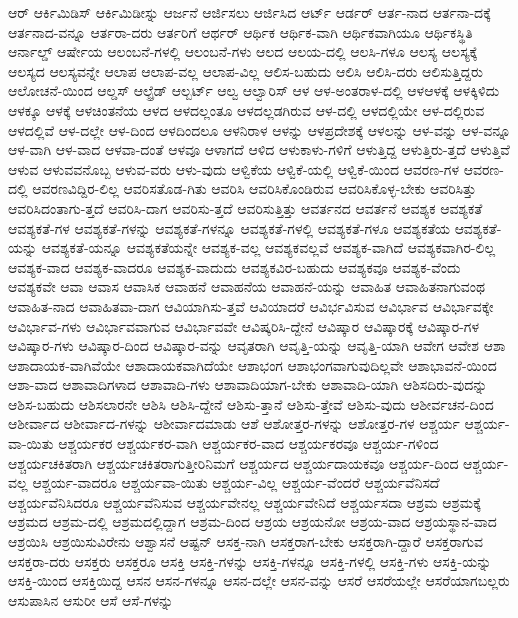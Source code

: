 {ಆರ್
ಆರ್ಕಿಮಿಡಿಸ್
ಆರ್ಕಿಮಿಡೀಸ್ನು
ಆರ್ಜನೆ
ಆರ್ಜಿಸಲು
ಆರ್ಜಿಸಿದ
ಆರ್ಟ್
ಆರ್ಡರ್
ಆರ್ತ-ನಾದ
ಆರ್ತನಾ-ದಕ್ಕೆ
ಆರ್ತನಾದ-ವನ್ನೂ
ಆರ್ತರಾ-ದರು
ಆರ್ತರಿಗೆ
ಆರ್ಥರ್
ಆರ್ಥಿಕ
ಆರ್ಥಿಕ-ವಾಗಿ
ಆರ್ಥಿಕವಾಗಿಯೂ
ಆರ್ಥಿಕಸ್ಥಿತಿ
ಆರ್ನಾಲ್ಡ್
ಆರ್ಷೇಯ
ಆಲಂಬನೆ-ಗಳಲ್ಲಿ
ಆಲಂಬನೆ-ಗಳು
ಆಲದ
ಆಲಯ-ದಲ್ಲಿ
ಆಲಸಿ-ಗಳೂ
ಆಲಸ್ಯ
ಆಲಸ್ಯಕ್ಕೆ
ಆಲಸ್ಯದ
ಆಲಸ್ಯವನ್ನೇ
ಆಲಾಪ
ಆಲಾಪ-ವಲ್ಲ
ಆಲಾಪ-ವಿಲ್ಲ
ಆಲಿಸ-ಬಹುದು
ಆಲಿಸಿ
ಆಲಿಸಿ-ದರು
ಆಲಿಸುತ್ತಿದ್ದರು
ಆಲೋಚನೆ-ಯಿಂದ
ಆಲ್ಡಸ್
ಆಲ್ಫ್ರೆಡ್
ಆಲ್ಬರ್ಟ್
ಆಲ್ವ
ಆಲ್ವಾರಿಸ್
ಆಳ
ಆಳ-ಅಂತರಾಳ-ದಲ್ಲಿ
ಆಳಆಳಕ್ಕೆ
ಆಳಕ್ಕಿಳಿದು
ಆಳಕ್ಕೂ
ಆಳಕ್ಕೆ
ಆಳಚಿಂತನೆಯ
ಆಳದ
ಆಳದಲ್ಲಂತೂ
ಆಳದಲ್ಲಡಗಿರುವ
ಆಳ-ದಲ್ಲಿ
ಆಳದಲ್ಲಿಯೇ
ಆಳ-ದಲ್ಲಿರುವ
ಆಳದಲ್ಲಿವೆ
ಆಳ-ದಲ್ಲೇ
ಆಳ-ದಿಂದ
ಆಳದಿಂದಲೂ
ಆಳನಿರಾಳ
ಆಳನ್ನು
ಆಳಪ್ರದೇಶಕ್ಕೆ
ಆಳಲನ್ನು
ಆಳ-ವನ್ನು
ಆಳ-ವನ್ನೂ
ಆಳ-ವಾಗಿ
ಆಳ-ವಾದ
ಆಳವಾ-ದಂತೆ
ಆಳವೂ
ಆಳಾಗದೆ
ಆಳಿದ
ಆಳುಕಾಳು-ಗಳಿಗೆ
ಆಳುತ್ತಿದ್ದ
ಆಳುತ್ತಿರು-ತ್ತದೆ
ಆಳುತ್ತಿವೆ
ಆಳುವ
ಆಳುವವನೊಬ್ಬ
ಆಳುವ-ವರು
ಆಳು-ವುದು
ಆಳ್ವಿಕೆಯ
ಆಳ್ವಿಕೆ-ಯಲ್ಲಿ
ಆಳ್ವಿಕೆ-ಯಿಂದ
ಆವರಣ-ಗಳ
ಆವರಣ-ದಲ್ಲಿ
ಆವರಣವಿದ್ದಿರ-ಲಿಲ್ಲ
ಆವರಿಸತೊಡ-ಗಿತು
ಆವರಿಸಿ
ಆವರಿಸಿಕೊಂಡಿರುವ
ಆವರಿಸಿಕೊಳ್ಳ-ಬೇಕು
ಆವರಿಸಿತ್ತು
ಆವರಿಸಿದಂತಾಗು-ತ್ತದೆ
ಆವರಿಸಿ-ದಾಗ
ಆವರಿಸು-ತ್ತದೆ
ಆವರಿಸುತ್ತಿತ್ತು
ಆವರ್ತನದ
ಆವರ್ತನೆ
ಆವಶ್ಯಕ
ಆವಶ್ಯಕತೆ
ಆವಶ್ಯಕತೆ-ಗಳ
ಆವಶ್ಯಕತೆ-ಗಳನ್ನು
ಆವಶ್ಯಕತೆ-ಗಳನ್ನೂ
ಆವಶ್ಯಕತೆ-ಗಳಲ್ಲಿ
ಆವಶ್ಯಕತೆ-ಗಳೂ
ಆವಶ್ಯಕತೆಯ
ಆವಶ್ಯಕತೆ-ಯನ್ನು
ಆವಶ್ಯಕತೆ-ಯನ್ನೂ
ಆವಶ್ಯಕತೆಯನ್ನೇ
ಆವಶ್ಯಕ-ವಲ್ಲ
ಆವಶ್ಯಕವಲ್ಲವೆ
ಆವಶ್ಯಕ-ವಾಗಿದೆ
ಆವಶ್ಯಕವಾಗಿರ-ಲಿಲ್ಲ
ಆವಶ್ಯಕ-ವಾದ
ಆವಶ್ಯಕ-ವಾದರೂ
ಆವಶ್ಯಕ-ವಾದುದು
ಆವಶ್ಯಕವಿರ-ಬಹುದು
ಆವಶ್ಯಕವೂ
ಆವಶ್ಯಕ-ವೆಂದು
ಆವಶ್ಯಕವೇ
ಆವಾ
ಆವಾಸ
ಆವಾಸಿಕ
ಆವಾಹನೆ
ಆವಾಹನೆಯ
ಆವಾಹನೆ-ಯನ್ನು
ಆವಾಹಿತ
ಆವಾಹಿತನಾಗುವಂಥ
ಆವಾಹಿತ-ನಾದ
ಆವಾಹಿತವಾ-ದಾಗ
ಆವಿಯಾಗಿಸು-ತ್ತವೆ
ಆವಿಯಾದರೆ
ಆವಿರ್ಭವಿಸುವ
ಆವಿರ್ಭಾವ
ಆವಿರ್ಭಾವಕ್ಕೇ
ಆವಿರ್ಭಾವ-ಗಳು
ಆವಿರ್ಭಾವವಾಗುವ
ಆವಿರ್ಭಾವವೇ
ಆವಿಷ್ಕರಿಸಿ-ದ್ದೇನೆ
ಆವಿಷ್ಕಾರ
ಆವಿಷ್ಕಾರಕ್ಕೆ
ಆವಿಷ್ಕಾರ-ಗಳ
ಆವಿಷ್ಕಾರ-ಗಳು
ಆವಿಷ್ಕಾರ-ದಿಂದ
ಆವಿಷ್ಕಾರ-ವನ್ನು
ಆವೃತರಾಗಿ
ಆವೃತ್ತಿ-ಯನ್ನು
ಆವೃತ್ತಿ-ಯಾಗಿ
ಆವೇಗ
ಆವೇಶ
ಆಶಾ
ಆಶಾದಾಯಕ-ವಾಗಿವೆಯೇ
ಆಶಾದಾಯಕವಾಗಿದೆಯೇ
ಆಶಾಭಂಗ
ಆಶಾಭಂಗವಾಗುವುದಿಲ್ಲವೇ
ಆಶಾಭಾವನೆ-ಯಿಂದ
ಆಶಾ-ವಾದ
ಆಶಾವಾದಿಗಳಾದ
ಆಶಾವಾದಿ-ಗಳು
ಆಶಾವಾದಿಯಾಗ-ಬೇಕು
ಆಶಾವಾದಿ-ಯಾಗಿ
ಆಶಿಸದಿರು-ವುದನ್ನು
ಆಶಿಸ-ಬಹುದು
ಆಶಿಸಲಾರನೇ
ಆಶಿಸಿ
ಆಶಿಸಿ-ದ್ದೇನೆ
ಆಶಿಸು-ತ್ತಾನೆ
ಆಶಿಸು-ತ್ತೇವೆ
ಆಶಿಸು-ವುದು
ಆಶೀರ್ವಚನ-ದಿಂದ
ಆಶೀರ್ವಾದ
ಆಶೀರ್ವಾದ-ಗಳನ್ನು
ಆಶೀರ್ವಾದಮಾಡು
ಆಶೆ
ಆಶೋತ್ತರ-ಗಳನ್ನು
ಆಶೋತ್ತರ-ಗಳ
ಆಶ್ಚರ್ಯ
ಆಶ್ಚರ್ಯ-ವಾ-ಯಿತು
ಆಶ್ಚರ್ಯಕರ
ಆಶ್ಚರ್ಯಕರ-ವಾಗಿ
ಆಶ್ಚರ್ಯಕರ-ವಾದ
ಆಶ್ಚರ್ಯಕರವೂ
ಆಶ್ಚರ್ಯ-ಗಳಿಂದ
ಆಶ್ಚರ್ಯಚಕಿತರಾಗಿ
ಆಶ್ಚರ್ಯಚಕಿತರಾಗುತ್ತೀರಿನಿಮಗೆ
ಆಶ್ಚರ್ಯದ
ಆಶ್ಚರ್ಯದಾಯಕವೂ
ಆಶ್ಚರ್ಯ-ದಿಂದ
ಆಶ್ಚರ್ಯ-ವಲ್ಲ
ಆಶ್ಚರ್ಯ-ವಾದರೂ
ಆಶ್ಚರ್ಯವಾ-ಯಿತು
ಆಶ್ಚರ್ಯ-ವಿಲ್ಲ
ಆಶ್ಚರ್ಯ-ವೆಂದರೆ
ಆಶ್ಚರ್ಯವೆನಿಸದೆ
ಆಶ್ಚರ್ಯವೆನಿಸಿದರೂ
ಆಶ್ಚರ್ಯವೆನಿಸುವ
ಆಶ್ಚರ್ಯವೇನಲ್ಲ
ಆಶ್ಚರ್ಯವೇನಿದೆ
ಆಶ್ಚರ್ಯಸದಾ
ಆಶ್ರಮ
ಆಶ್ರಮಕ್ಕೆ
ಆಶ್ರಮದ
ಆಶ್ರಮ-ದಲ್ಲಿ
ಆಶ್ರಮದಲ್ಲಿದ್ದಾಗ
ಆಶ್ರಮ-ದಿಂದ
ಆಶ್ರಯ
ಆಶ್ರಯನೋ
ಆಶ್ರಯ-ವಾದ
ಆಶ್ರಯಸ್ಥಾನ-ವಾದ
ಆಶ್ರಯಿಸಿ
ಆಶ್ರಯಿಸುವಿರೇನು
ಆಶ್ವಾಸನೆ
ಆಷ್ಟನ್
ಆಸಕ್ತ-ನಾಗಿ
ಆಸಕ್ತರಾಗ-ಬೇಕು
ಆಸಕ್ತರಾಗಿ-ದ್ದಾರೆ
ಆಸಕ್ತರಾಗುವ
ಆಸಕ್ತರಾ-ದರು
ಆಸಕ್ತರು
ಆಸಕ್ತರೂ
ಆಸಕ್ತಿ
ಆಸಕ್ತಿ-ಗಳನ್ನು
ಆಸಕ್ತಿ-ಗಳನ್ನೂ
ಆಸಕ್ತಿ-ಗಳಲ್ಲಿ
ಆಸಕ್ತಿ-ಗಳು
ಆಸಕ್ತಿ-ಯನ್ನು
ಆಸಕ್ತಿ-ಯಿಂದ
ಆಸಕ್ತಿಯಿದ್ದ
ಆಸನ
ಆಸನ-ಗಳನ್ನೂ
ಆಸನ-ದಲ್ಲೇ
ಆಸನ-ವನ್ನು
ಆಸರೆ
ಆಸರೆಯಲ್ಲೇ
ಆಸರೆಯಾಗಬಲ್ಲರು
ಆಸುಪಾಸಿನ
ಆಸುರೀ
ಆಸೆ
ಆಸೆ-ಗಳನ್ನು
}
